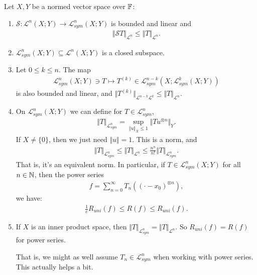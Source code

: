 \documentclass{report}
\begin{document}
Let $X,Y$ be a normed vector space over $\FF$:
\begin{enumerate}
    \item $\mathcal S: \mathcal L^n(X; Y) \to \mathcal L^n_{sym}(X; Y)$ is bounded and linear and 
    \begin{align*}
        \Vert \mathcal ST\Vert_{\mathcal L^n} \leq \Vert T\Vert_{\mathcal L^n}.
    \end{align*}
    \item $\mathcal L^n_{sym}(X; Y) \subseteq \mathcal L^n(X; Y)$ is a closed subspace. 
    \item Let $0 \leq k \leq n$. The map 
    \begin{align*}
        \mathcal L^n_{sym}(X; Y) \ni T \mapsto T^{(k)} \in \mathcal L^{n-k}_{sym}(X; \mathcal L^k_{sym}(X; Y))
    \end{align*}
    is also bounded and linear, and $\Vert T^{(k)}\Vert_{\mathcal L^{n-k} \mathcal L^k} \leq \Vert T \Vert_{\mathcal L^n}$.
    \item On $\mathcal L^n_{sym}( X; Y)$ we can define for $T \in \mathcal L^n_{sym}$,
    \begin{align*}
        \Vert T \Vert_{\mathcal L^n_{sym}} = \sup_{\Vert u \Vert_X \leq 1} \Vert Tu^{\otimes n} \Vert_Y.
    \end{align*}
    If $X \neq \{0\}$, then we just need $\Vert u \Vert = 1$. This is a norm, and 
    \begin{align*}
        \Vert T \Vert_{\mathcal L^n_{sym}} \leq \Vert T \Vert_{\mathcal L^n} \leq \frac{n^n}{n!}\Vert T\Vert_{\mathcal L^n_{sym}}.
    \end{align*}
    That is, it's an equivalent norm. In particular, if $T \in \mathcal L^n_{sym}(X; Y)$ for all $n \in \NN$, then the power series 
    \begin{align*}
        f =\sum_{n=0}^\infty T_n((\cdot - x_0)^{\otimes n}),
    \end{align*}
    we have:
    \begin{align*}
        \frac 1e R_{uni}(f) \leq R(f) \leq R_{uni}(f).
    \end{align*}
    \item If $X$ is an inner product space, then $\Vert T\Vert_{\mathcal L^n_{sym}} = \Vert T\Vert_{\mathcal L^n}$. So $R_{uni}(f) = R(f)$ for power series.
    
    That is, we might as well assume $T_n \in \mathcal L^n_{sym}$ when working with power series. This actually helps a bit.
\end{enumerate}
\end{document}

